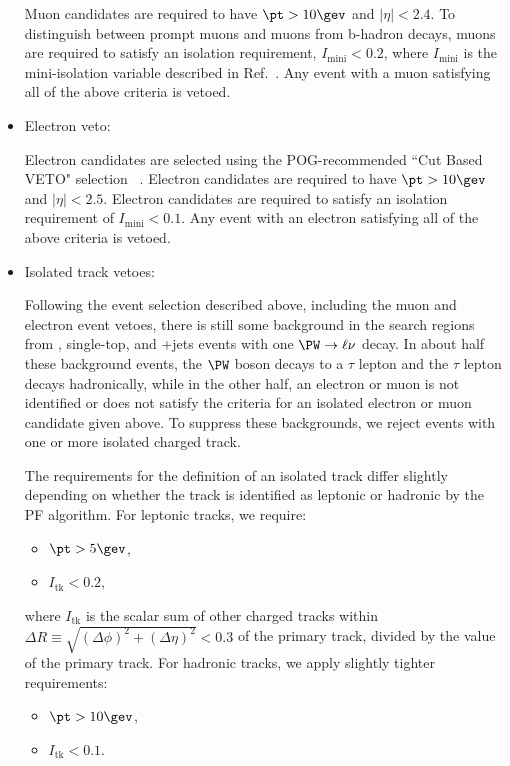 \begin{itemize}
  Muon candidates are required to have $\pt>10\gev$ and $|\eta|<2.4$.
  To distinguish between prompt muons and muons from b-hadron
  decays, muons are required to satisfy an isolation requirement,
  $I_{\mathrm{mini}}<0.2$, where $I_{\mathrm{mini}}$ is the mini-isolation
  variable described in Ref.~\cite{RA4EANote}.  Any event with a muon satisfying all of the
  above criteria is vetoed.

\item Electron veto:

  Electron candidates are selected using the POG-recommended
  ``Cut Based VETO" selection ~\cite{POGelectron}.
  Electron candidates are required to have $\pt>10\gev$ and $|\eta|<2.5$.
  Electron candidates are required to satisfy an isolation
  requirement of $I_{\mathrm{mini}}<0.1$. Any event with an electron satisfying all of the
  above criteria is vetoed.
\item Isolated track vetoes:
  
  Following the event selection described above,
  including the muon and electron event vetoes,
  there is still some background in the search regions from
  \ttbar, single-top, and {\PW}+jets events with one $\PW\rightarrow\ell\nu$
  decay.  In about half these background events, the $\PW$ boson decays to a $\tau$ lepton
  and the $\tau$ lepton decays hadronically,
  while in the other half, an electron or muon is not identified
  or does not satisfy the criteria for an isolated electron or muon
  candidate given above.
  To suppress these backgrounds,
  we reject events with one or more isolated
  charged track.

  The requirements for the definition of an isolated track
  differ slightly depending on whether the track is identified
  as leptonic or hadronic by the PF algorithm.
  For leptonic tracks, we require:
  \begin{itemize}
  \item $\pt>5\gev$,
  \item $I_{\mathrm{tk}}<0.2$,
  \end{itemize}
  where $I_{\mathrm{tk}}$ is the scalar \pt sum of other
  charged tracks within $\Delta R\equiv\sqrt{(\Delta\phi)^2+(\Delta\eta)^2}<0.3$ of the primary track, divided
  by the \pt value of the primary track.
  For hadronic tracks, we apply slightly tighter requirements:
  \begin{itemize}
  \item $\pt>10\gev$,
  \item $I_{\mathrm{tk}}<0.1$.
  \end{itemize}


\end{itemize}
